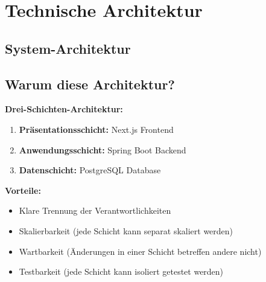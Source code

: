 \documentclass[a4paper,12pt]{article}
\begin{document}
\section{Technische Architektur}

\subsection{System-Architektur}

\begin{center}
\end{center}

\subsection{Warum diese Architektur?}

\textbf{Drei-Schichten-Architektur:}
\begin{enumerate}
    \item \textbf{Präsentationsschicht:} Next.js Frontend
    \item \textbf{Anwendungsschicht:} Spring Boot Backend
    \item \textbf{Datenschicht:} PostgreSQL Database
\end{enumerate}

\textbf{Vorteile:}
\begin{itemize}
    \item Klare Trennung der Verantwortlichkeiten
    \item Skalierbarkeit (jede Schicht kann separat skaliert werden)
    \item Wartbarkeit (Änderungen in einer Schicht betreffen andere nicht)
    \item Testbarkeit (jede Schicht kann isoliert getestet werden)
\end{itemize}
\end{document}
